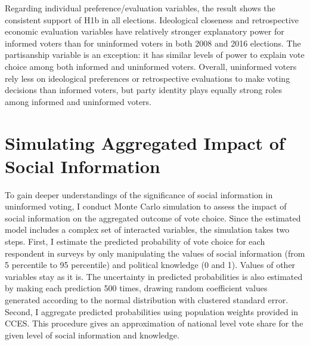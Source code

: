 \documentclass[doc,natbib,12pt]{apa6}\usepackage[]{graphicx}\usepackage[]{color}
\begin{document}
    
    \par Regarding individual preference/evaluation variables, the result shows the consistent support of H1b in all elections. Ideological closeness and retrospective economic evaluation variables have relatively stronger explanatory power for informed voters than for uninformed voters in both 2008 and 2016 elections. The partisanship variable is an exception: it has similar levels of power to explain vote choice among both informed and uninformed voters. Overall, uninformed voters rely less on ideological preferences or retrospective evaluations to make voting decisions than informed voters, but party identity plays equally strong roles among informed and uninformed voters.
    
    \section{Simulating Aggregated Impact of Social Information}

    \par To gain deeper understandings of the significance of social information in uninformed voting, I conduct Monte Carlo simulation to assess the impact of social information on the aggregated outcome of vote choice. Since the estimated model includes a complex set of interacted variables, the simulation takes two steps. First, I estimate the predicted probability of vote choice for each respondent in surveys by only manipulating the values of social information (from 5 percentile to 95 percentile) and political knowledge (0 and 1). Values of other variables stay as it is. The uncertainty in predicted probabilities is also estimated by making each prediction 500 times, drawing random coefficient values generated according to the normal distribution with clustered standard error. Second, I aggregate predicted probabilities using population weights provided in CCES. This procedure gives an approximation of national level vote share for the given level of social information and knowledge. 
\end{document}
